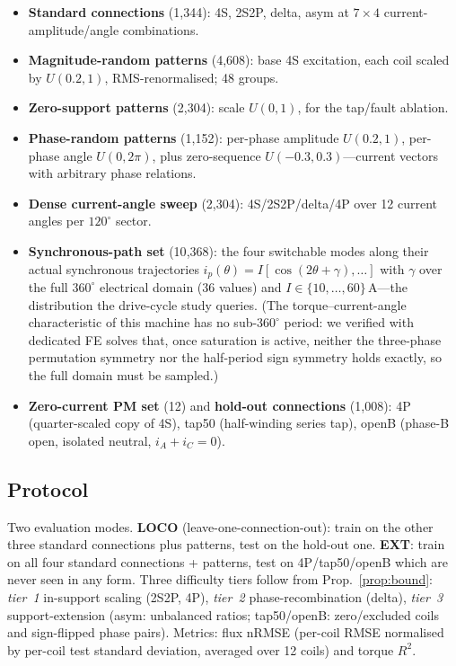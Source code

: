 \documentclass[review]{elsarticle}
\begin{document}
\begin{itemize}
\item \textbf{Standard connections} (1{,}344): 4S, 2S2P, delta, asym at
$7\times4$ current-amplitude/angle combinations.
\item \textbf{Magnitude-random patterns} (4{,}608): base 4S excitation, each
coil scaled by $U(0.2,1)$, RMS-renormalised; 48 groups.
\item \textbf{Zero-support patterns} (2{,}304): scale $U(0,1)$, for the
tap/fault ablation.
\item \textbf{Phase-random patterns} (1{,}152): per-phase amplitude
$U(0.2,1)$, per-phase angle $U(0,2\pi)$, plus zero-sequence
$U(-0.3,0.3)$---current vectors with arbitrary phase relations.
\item \textbf{Dense current-angle sweep} (2{,}304): 4S/2S2P/delta/4P over 12
current angles per $120^\circ$ sector.
\item \textbf{Synchronous-path set} (10{,}368): the four switchable modes
along their actual synchronous trajectories
$i_p(\theta)\!=\!I[\cos(2\theta\!+\!\gamma),\dots]$ with
$\gamma$ over the full $360^\circ$ electrical domain (36 values) and
$I\!\in\!\{10,\dots,60\}$\,A---the distribution the drive-cycle study
queries. (The torque--current-angle characteristic of this machine has no
sub-$360^\circ$ period: we verified with dedicated FE solves that, once
saturation is active, neither the three-phase permutation symmetry nor the
half-period sign symmetry holds exactly, so the full domain must be sampled.)
\item \textbf{Zero-current PM set} (12) and \textbf{hold-out connections}
(1{,}008): 4P (quarter-scaled copy of 4S), tap50 (half-winding series tap),
openB (phase-B open, isolated neutral, $i_A+i_C=0$).
\end{itemize}

\subsection{Protocol}

Two evaluation modes. \textbf{LOCO} (leave-one-connection-out): train on the
other three standard connections plus patterns, test on the hold-out one.
\textbf{EXT}: train on all four standard connections + patterns, test on
4P/tap50/openB which are never seen in any form. Three difficulty tiers
follow from Prop.~\ref{prop:bound}: \emph{tier~1} in-support scaling (2S2P,
4P), \emph{tier~2} phase-recombination (delta), \emph{tier~3}
support-extension (asym: unbalanced ratios; tap50/openB: zero/excluded coils
and sign-flipped phase pairs). Metrics: flux nRMSE (per-coil RMSE normalised
by per-coil test standard deviation, averaged over 12 coils) and torque $R^2$.
\end{document}

